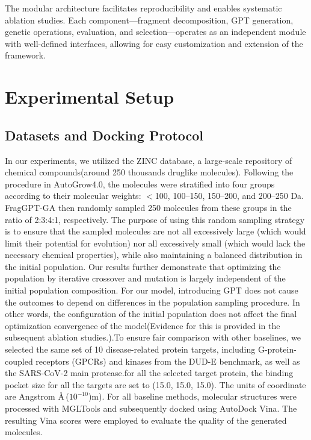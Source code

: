 \documentclass[lettersize,journal]{IEEEtran}
\begin{document}
The modular architecture facilitates reproducibility and enables systematic ablation studies. Each component—fragment decomposition, GPT generation, genetic operations, evaluation, and selection—operates as an independent module with well-defined interfaces, allowing for easy customization and extension of the framework.


\section{Experimental Setup}
\subsection{Datasets and Docking Protocol}
In our experiments, we utilized the ZINC\cite{doi:10.1021/acs.jcim.5b00559} database, a large-scale repository of chemical compounds(around 250 thousands druglike molecules). Following the procedure in AutoGrow4.0\cite{qingfuzhangMOEAMultiobjectiveEvolutionary2007}, the molecules were stratified into four groups according to their molecular weights: $<$100, 100–150, 150–200, and 200–250 Da. FragGPT-GA then randomly sampled 250 molecules from these groups in the ratio of 2:3:4:1, respectively. The purpose of using this random sampling strategy is to ensure that the sampled molecules are not all excessively large (which would limit their potential for evolution) nor all excessively small (which would lack the necessary chemical properties), while also maintaining a balanced distribution in the initial population. Our results further demonstrate that optimizing the population by iterative crossover and mutation is largely independent of the initial population composition\cite{spiegelAutoGrow4OpensourceGenetic2020}. For our model, introducing GPT does not cause the outcomes to depend on differences in the population sampling procedure. In other words, the configuration of the initial population does not affect the final optimization convergence of the model(Evidence for this is provided in the subsequent ablation studies.).To ensure fair comparison with other baselines, we selected the same set of 10 disease-related protein targets, including G-protein-coupled receptors (GPCRs) and kinases from the DUD-E\cite{mysinger2012directory} benchmark, as well as the SARS-CoV-2 main protease\cite{shi2020graphaf}.for all the selected target protein, the binding pocket size for all the targets are set to (15.0, 15.0, 15.0). The units of coordinate are Angstrom \AA\,($10^{-10}$)m).\cite{fuReinforcedGeneticAlgorithm} For all baseline methods, molecular structures were processed with MGLTools and subsequently docked using AutoDock Vina\cite{trott2010autodock}. The resulting Vina scores were employed to evaluate the quality of the generated molecules.
\end{document}

